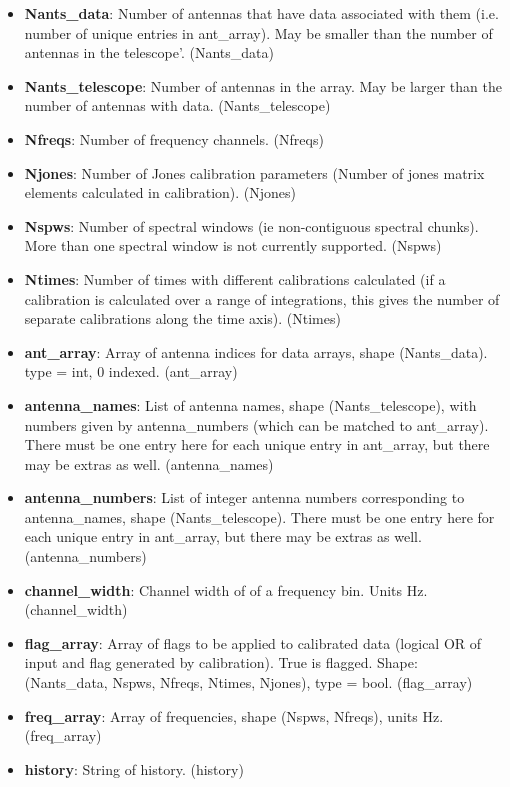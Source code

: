 \documentclass[11pt, oneside, english]{article}   	%
\begin{document}
\begin{itemize}
\item{\textbf{Nants\_data}: Number of antennas that have data associated with them 
    (i.e. number of unique entries in ant\_array). May be smaller than the number of 
    antennas in the telescope'. (Nants\_data)}
\item{\textbf{Nants\_telescope}: Number of antennas in the array. May be larger
    than the number of antennas with data. (Nants\_telescope)}
\item{\textbf{Nfreqs}: Number of frequency channels. (Nfreqs)}
\item{\textbf{Njones}: Number of Jones calibration parameters (Number of
    jones matrix elements calculated in calibration). (Njones)}
\item{\textbf{Nspws}: Number of spectral windows (ie non-contiguous spectral
    chunks). More than one spectral window is not currently supported. (Nspws)}
\item{\textbf{Ntimes}: Number of times with different calibrations calculated
    (if a calibration is calculated over a range of integrations, this gives the
    number of separate calibrations along the time axis). (Ntimes)}
\item{\textbf{ant\_array}: Array of antenna indices for data arrays, shape
    (Nants\_data). type = int, 0 indexed. (ant\_array)}
\item{\textbf{antenna\_names}: List of antenna names, shape (Nants\_telescope),
    with numbers given by antenna\_numbers (which can be matched to ant\_array).
    There must be one entry here for each unique entry in ant\_array, but there may be extras as well. (antenna\_names)}
\item{\textbf{antenna\_numbers}: List of integer antenna numbers corresponding
    to antenna\_names, shape (Nants\_telescope). There must be one entry here for each unique entry in ant\_array, but there may be extras as well. (antenna\_numbers)}
\item{\textbf{channel\_width}: Channel width of of a frequency bin. Units Hz. (channel\_width)}
\item{\textbf{flag\_array}: Array of flags to be applied to calibrated data
    (logical OR of input and flag generated by calibration). True is flagged.
    Shape: (Nants\_data, Nspws, Nfreqs, Ntimes, Njones), type = bool. (flag\_array)}
\item{\textbf{freq\_array}: Array of frequencies, shape (Nspws, Nfreqs), units
    Hz. (freq\_array)}
\item{\textbf{history}: String of history. (history)} %

\end{itemize}
\end{document}
